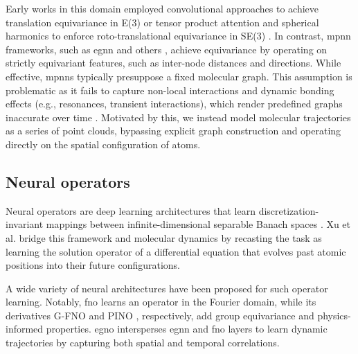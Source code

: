 Early works in this domain employed convolutional approaches to achieve translation equivariance in E(3) \cite{weiler_3d_2018, wu_pointconv_2020} or tensor product attention and spherical harmonics to enforce roto-translational equivariance in SE(3) \cite{fuchs_se3-transformers_2020,thomas_tensor_2018}. In contrast, \gls{mpnn} frameworks, such as \gls{egnn} and others \cite{garcia_satorras_en_2021, gasteiger_gemnet_2021, huang_equivariant_2022}, achieve equivariance by operating on strictly equivariant features, such as inter-node distances and directions. While effective, \glspl{mpnn} typically presuppose a fixed molecular graph. This assumption is problematic as it fails to capture non-local interactions and dynamic bonding effects (e.g., resonances, transient interactions), which render predefined graphs inaccurate over time \cite{knutson_dynamic_2022,luo_predicting_2021}. Motivated by this, we instead model molecular trajectories as a series of point clouds, bypassing explicit graph construction and operating directly on the spatial configuration of atoms.


\subsection{Neural operators}
Neural operators are deep learning architectures that learn discretization-invariant mappings between infinite-dimensional separable Banach spaces \cite{kovachki_neural_2021}. Xu et al. \cite{xu_equivariant_2024} bridge this framework and molecular dynamics by recasting the task as learning the solution operator of a differential equation that evolves past atomic positions into their future configurations.

A wide variety of neural architectures have been proposed for such operator learning. Notably, \gls{fno} \cite{li_fourier_2021} learns an operator in the Fourier domain, while its derivatives G-FNO \cite{helwig_group_2023} and PINO \cite{li_physics-informed_2023}, respectively, add group equivariance and physics-informed properties. \gls{egno} \cite{xu_equivariant_2024} intersperses \gls{egnn} and \gls{fno} layers to learn dynamic trajectories by capturing both spatial and temporal correlations.

